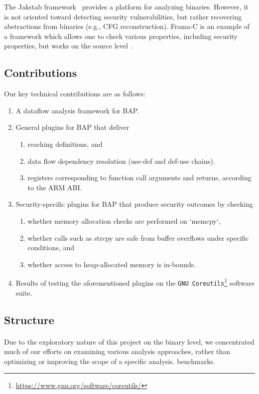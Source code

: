 \documentclass[letterpaper,11pt]{article}
\begin{document}
The Jakstab framework~\cite{kinder2008jakstab} provides a platform for
analyzing binaries. However, it is not oriented toward detecting security
vulnerabilities, but rather recovering abstractions from binaries (e.g.,
CFG reconstruction). Frama-C is an example of a framework which
allows one to check various properties, including security properties,
but works on the source level~\cite{cuoq2012frama}.

\subsection{Contributions}

Our key technical contributions are as follows:

\begin{enumerate}
  \item A dataflow analysis framework for BAP.
  \item General plugins for BAP that deliver
    \begin{enumerate}
      \item reaching definitions, and
      \item data flow dependency resolution (use-def and def-use chains).
      \item registers corresponding to function call arguments and returns,
            according to the ARM ABI.
    \end{enumerate}
  \item Security-specific plugins for BAP that produce security outcomes by checking
    \begin{enumerate}
      \item whether memory allocation checks are performed on `memcpy`,
      \item whether calls such as strcpy are safe from buffer overflows under
        specific conditions, and
      \item whether access to heap-allocated memory is in-bounds.
    \end{enumerate}
  \item Results of testing the aforementioned plugins on the \texttt{GNU Coreutils}\footnote{\url{https://www.gnu.org/software/coreutils/}}
    software suite.
\end{enumerate}

\subsection{Structure}

\paragraph{}
Due to the exploratory nature of this project on the binary level, we
concentrated much of our efforts on examining various analysis approaches,
rather than optimizing or improving the scope of a specific analysis.
benchmarks.
\end{document}
